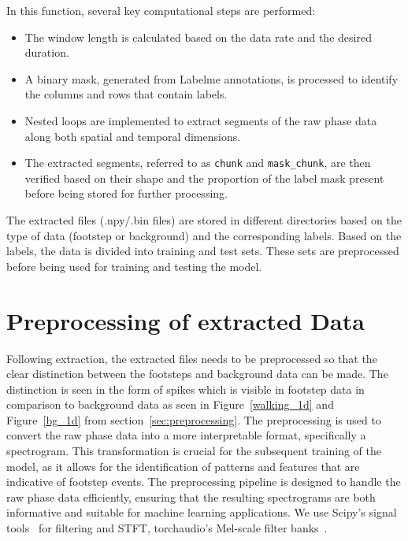 In this function, several key computational steps are performed:
    \begin{itemize}
        \item The window length is calculated based on the data rate and the desired duration.
        \item A binary mask, generated from Labelme annotations, is processed to identify the columns and rows that contain labels.
        \item Nested loops are implemented to extract segments of the raw phase data along both spatial and temporal dimensions.
        \item The extracted segments, referred to as \texttt{chunk} and \texttt{mask\_chunk}, are then verified based on their shape and the proportion of the label mask present before being stored for further processing.
    \end{itemize}

The extracted files (.npy/.bin files) are stored in different directories based on the type of data (footstep or background) and the corresponding labels. Based on the labels, the data is divided into training and test sets. 
These sets are preprocessed before being used for training and testing the model. 

\section{Preprocessing of extracted Data}
\label{preproc}
Following extraction, the extracted files needs to be preprocessed so that the clear distinction between the footsteps and background data can be made. The distinction is seen in the form of spikes which is visible in footstep data in comparison to background data as seen in Figure~\ref{walking_1d} and Figure~\ref{bg_1d} from section~\ref{sec:preprocessing}.  The preprocessing is used to convert the raw phase data into a more interpretable format, specifically a spectrogram. This transformation is crucial for the subsequent training of the model, as it allows for the identification of patterns and features that are indicative of footstep events. The preprocessing pipeline is designed to handle the raw phase data efficiently, ensuring that the resulting spectrograms are both informative and suitable for machine learning applications. We use Scipy's signal tools~\cite{scipy2020} for filtering and STFT, torchaudio's Mel-scale filter banks~\cite{torchaudio2024}.


